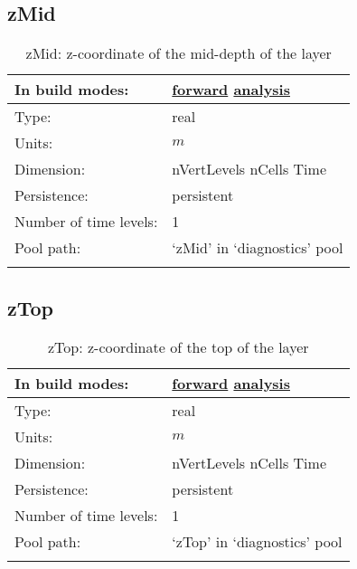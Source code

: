 \subsection[zMid]{zMid}
\label{subsec:var_sec_diagnostics_zMid}
\begin{center}
\begin{longtable}{| p{2.0in} | p{4.0in} |}
        \hline 
        In build modes: & \hyperref[subsec:forward_var_tab_diagnostics]{forward} \hyperref[subsec:analysis_var_tab_diagnostics]{analysis} \\
        \hline 
        Type: & real \\
        \hline 
        Units: & $m$ \\
        \hline 
        Dimension: & nVertLevels nCells Time \\
        \hline 
        Persistence: & persistent \\
        \hline 
        Number of time levels: & 1 \\
        \hline 
            Pool path: & `zMid' in `diagnostics' pool \\
		 \hline 
    \caption{zMid: z-coordinate of the mid-depth of the layer}
\end{longtable}
\end{center}
\subsection[zTop]{zTop}
\label{subsec:var_sec_diagnostics_zTop}
\begin{center}
\begin{longtable}{| p{2.0in} | p{4.0in} |}
        \hline 
        In build modes: & \hyperref[subsec:forward_var_tab_diagnostics]{forward} \hyperref[subsec:analysis_var_tab_diagnostics]{analysis} \\
        \hline 
        Type: & real \\
        \hline 
        Units: & $m$ \\
        \hline 
        Dimension: & nVertLevels nCells Time \\
        \hline 
        Persistence: & persistent \\
        \hline 
        Number of time levels: & 1 \\
        \hline 
            Pool path: & `zTop' in `diagnostics' pool \\
		 \hline 
    \caption{zTop: z-coordinate of the top of the layer}
\end{longtable}
\end{center}
